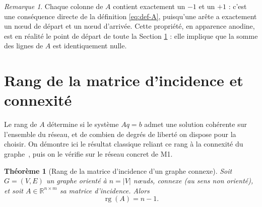 \documentclass[11pt,a4paper]{article}
\theoremstyle{plain}
\newtheorem{theoreme}{Théorème}
\theoremstyle{definition}
\theoremstyle{remark}
\newtheorem{remarque}{Remarque}
\begin{document}
\begin{remarque}
Chaque colonne de $A$ contient exactement un $-1$ et un $+1$ : c'est une
conséquence directe de la définition \eqref{eq:def-A}, puisqu'une arête a
exactement un nœud de départ et un nœud d'arrivée. Cette propriété, en
apparence anodine, est en réalité le point de départ de toute la Section
\ref{sec:rang} : elle implique que la somme des lignes de $A$ est
identiquement nulle.
\end{remarque}

\section{Rang de la matrice d'incidence et connexité}
\label{sec:rang}

Le rang de $A$ détermine si le système $Aq = b$ admet une solution
cohérente sur l'ensemble du réseau, et de combien de degrés de liberté on
dispose pour la choisir. On démontre ici le résultat classique reliant ce
rang à la connexité du graphe~\cite{godsil2001,diestel2010}, puis on le
vérifie sur le réseau concret de M1.

\begin{theoreme}[Rang de la matrice d'incidence d'un graphe connexe]
Soit $G = (V, E)$ un graphe orienté à $n = |V|$ nœuds, connexe (au sens
non orienté), et soit $A \in \mathbb{R}^{n \times m}$ sa matrice
d'incidence. Alors
\begin{equation}
\operatorname{rg}(A) = n - 1.
\label{eq:rang-theoreme}
\end{equation}
\end{theoreme}
\end{document}
